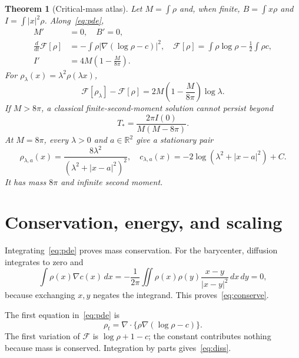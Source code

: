 \documentclass[10pt]{article}
\newtheorem{theorem}{Theorem}
\newcommand{\Rtwo}{\mathbb R^2}
\newcommand{\F}{\mathcal F}
\begin{document}
\begin{theorem}[Critical-mass atlas]\label{thm:atlas}
Let $M=\int\rho$ and, when finite,
$B=\int x\rho$ and $I=\int |x|^2\rho$.  Along~\eqref{eq:pde},
\begin{align}
 M'&=0,\quad B'=0,                                   \label{eq:conserve}\\
 \frac{d}{dt}\F[\rho]
 &=-\int\rho\left|\nabla(\log\rho-c)\right|^2,\quad
 \F[\rho]=\int\rho\log\rho-\frac12\int\rho c,        \label{eq:diss}\\
 I'&=4M\left(1-\frac{M}{8\pi}\right).                \label{eq:virial}
\end{align}
For $\rho_\lambda(x)=\lambda^2\rho(\lambda x)$,
\begin{equation}
 \F[\rho_\lambda]-\F[\rho]
 =2M\left(1-\frac{M}{8\pi}\right)\log\lambda.        \label{eq:scale}
\end{equation}
If $M>8\pi$, a classical finite-second-moment solution cannot persist beyond
\begin{equation}
 T_*=\frac{2\pi I(0)}{M(M-8\pi)}.                    \label{eq:bound}
\end{equation}
At $M=8\pi$, every $\lambda>0$ and $a\in\Rtwo$ give a stationary pair
\begin{equation}
 \rho_{\lambda,a}(x)=
 \frac{8\lambda^2}{(\lambda^2+|x-a|^2)^2},\quad
 c_{\lambda,a}(x)=-2\log(\lambda^2+|x-a|^2)+C.       \label{eq:profile}
\end{equation}
It has mass $8\pi$ and infinite second moment.
\end{theorem}

\section{Conservation, energy, and scaling}

Integrating~\eqref{eq:pde} proves mass conservation.  For the barycenter, diffusion
integrates to zero and
\[
 \int\rho(x)\nabla c(x)\,dx
 =-\frac1{2\pi}\iint \rho(x)\rho(y)
       \frac{x-y}{|x-y|^2}\,dx\,dy=0,
\]
because exchanging $x,y$ negates the integrand.  This proves~\eqref{eq:conserve}.

The first equation in~\eqref{eq:pde} is
\begin{equation}
 \rho_t=\nabla\!\cdot\{\rho\nabla(\log\rho-c)\}.      \label{eq:gradient}
\end{equation}
The first variation of $\F$ is $\log\rho+1-c$; the constant contributes
nothing because mass is conserved.  Integration by parts gives~\eqref{eq:diss}.
\end{document}
